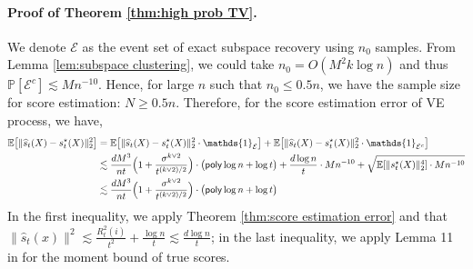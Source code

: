 \documentclass{article}
\newcommand{\ind}{\mathds{1}}
\newcommand{\bE}{\mathbb{E}}
\newcommand{\bP}{\mathbb{P}}
\newcommand{\polylog}{\mathsf{poly}\log}
\theoremstyle{plain}
\theoremstyle{remark}
\begin{document}
\paragraph*{Proof of Theorem \ref{thm:high prob TV}.}
We denote $\mathcal{E}$ as the event set of exact subspace recovery using $n_0$ samples. From Lemma \ref{lem:subspace clustering}, we could take $n_0 = O(M^2k\log n)$ and thus $\bP [\mathcal{E}^c] \lesssim Mn^{-10}$. 
Hence, for large $n$ such that $n_0 \leq 0.5 n$, we have the sample size for score estimation: $N \geq 0.5n$.
Therefore, for the score estimation error of VE process, we have, 
\begin{align}
    \bE \big[ \| \widehat{s}_{t}(X)-s_{t}^\star(X)\|_2^2\big] &= \bE \big[ \| \widehat{s}_{t}(X)-s_{t}^\star(X)\|_2^2 \cdot \ind_{\mathcal{E}} \big]  + \bE \big[ \| \widehat{s}_{t}(X)-s_{t}^\star(X)\|_2^2 \cdot \ind_{\mathcal{E}^c} \big] \notag \\
    & \lesssim \frac{dM^3}{nt} \Big( 1+\frac{\sigma^{k\vee2}}{t^{{(k\vee2)}/2}}\Big) \cdot \big(\polylog n +\log t\big) +\frac{d\log n}{t} \cdot Mn^{-10} + \sqrt{\bE[\| s_t^\star(X)\|_2^4] \cdot Mn^{-10}} \notag\\
    &\lesssim \frac{dM^3}{nt} \Big( 1+\frac{\sigma^{k\vee2}}{t^{{(k\vee2)}/2}}\Big) \cdot \big(\polylog n +\log t\big) \label{eq:score estimation error for VE}
\end{align} 
In the first inequality, we apply Theorem \ref{thm:score estimation error} and that $\|\widehat{s}_t(x)\|^2 \lesssim \frac{R_t^2(i)}{t^2} + \frac{\log n}{t} \lesssim \frac{d\log n}{t}$; in the last inequality, we apply Lemma 11 in \cite{cai2025minimaxoptimalityprobabilityflow} for the moment bound of true scores. 
\end{document}
